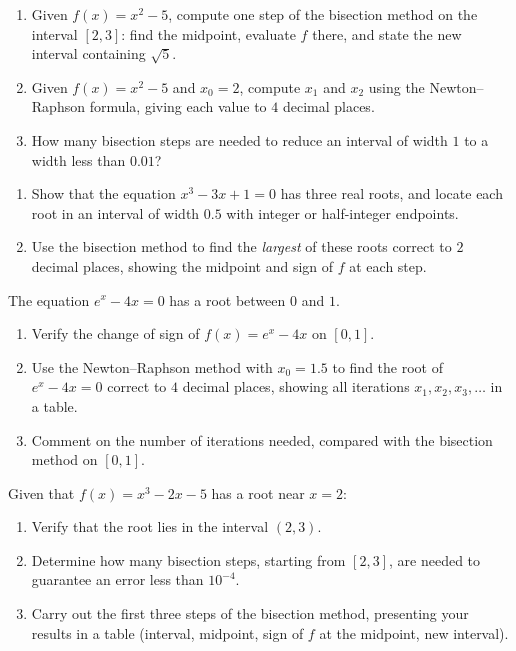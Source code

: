 \documentclass[11pt]{article}
\newcounter{popsec}
\newcounter{popsub}
\newcommand{\courssub}[1]{%
  \stepcounter{popsub}%
  \par\vspace{9pt}\noindent{\popxbold\fontsize{11.5}{13}\selectfont\color{popink}{\color{poporange}\thepopsec.\thepopsub}\hspace{6pt}#1}\par\nopagebreak\vspace{4pt}
}
\begin{document}
\begin{exercice}
\begin{enumerate}
\item Given $f(x) = x^{2} - 5$, compute one step of the bisection method on the interval $[2, 3]$: find the midpoint, evaluate $f$ there, and state the new interval containing $\sqrt{5}$.
\item Given $f(x) = x^{2} - 5$ and $x_{0} = 2$, compute $x_{1}$ and $x_{2}$ using the Newton--Raphson formula, giving each value to $4$ decimal places.
\item How many bisection steps are needed to reduce an interval of width $1$ to a width less than $0.01$?
\end{enumerate}
\end{exercice}

\courssub{I practise}

\begin{exercice}
\begin{enumerate}
\item Show that the equation $x^{3} - 3x + 1 = 0$ has three real roots, and locate each root in an interval of width $0.5$ with integer or half-integer endpoints.
\item Use the bisection method to find the \emph{largest} of these roots correct to $2$ decimal places, showing the midpoint and sign of $f$ at each step.
\end{enumerate}
\end{exercice}

\begin{exercice}
The equation $e^{x} - 4x = 0$ has a root between $0$ and $1$.
\begin{enumerate}
\item Verify the change of sign of $f(x) = e^{x} - 4x$ on $[0, 1]$.
\item Use the Newton--Raphson method with $x_{0} = 1.5$ to find the root of $e^{x} - 4x = 0$ correct to $4$ decimal places, showing all iterations $x_{1}, x_{2}, x_{3}, \ldots$ in a table.
\item Comment on the number of iterations needed, compared with the bisection method on $[0, 1]$.
\end{enumerate}
\end{exercice}

\begin{exercice}
Given that $f(x) = x^{3} - 2x - 5$ has a root near $x = 2$:
\begin{enumerate}
\item Verify that the root lies in the interval $(2, 3)$.
\item Determine how many bisection steps, starting from $[2, 3]$, are needed to guarantee an error less than $10^{-4}$.
\item Carry out the first three steps of the bisection method, presenting your results in a table (interval, midpoint, sign of $f$ at the midpoint, new interval).
\end{enumerate}
\end{exercice}
\end{document}
